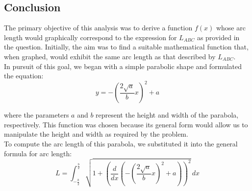 \documentclass[a4paper, 12pt]{report}
\begin{document}
\subsection{Conclusion}
\vspace{1em}

\begin{minipage}{0.45\textwidth}
    The primary objective of this analysis was to derive a function \( f(x) \) whose arc length would graphically correspond to the expression for \( L_{ABC} \) as provided in the question. Initially, the aim was to find a suitable mathematical function that, when graphed, would exhibit the same arc length as that described by \( L_{ABC} \).\\[8pt]
    In pursuit of this goal, we began with a simple parabolic shape and formulated the equation:
    \[y = -\left(\frac{2\sqrt{a}}{b}x\right)^2 + a\]
\end{minipage}\hfil
\begin{minipage}{0.45\textwidth}
    where the parameters \( a \) and \( b \) represent the height and width of the parabola, respectively. This function was chosen because its general form would allow us to manipulate the height and width as required by the problem.\\[8PT]
    To compute the arc length of this parabola, we substituted it into the general formula for arc length:
    \[L = \int_{-\frac{b}{2}}^{\frac{b}{2}} \sqrt{1 + \left( \frac{d}{dx}\left( -\left( \frac{2\sqrt{a}}{b}x \right)^2 + a \right) \right)^2} \, dx\]
\end{minipage}
\newpage
\end{document}
